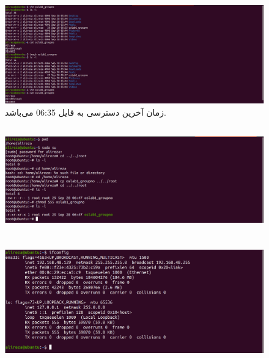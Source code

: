 \documentclass{article}
\begin{document}
\subsection{}
\begin{figure}[ht]
    \centering
    \includegraphics[width=1.0\textwidth]{figures/1.3.png}
    \caption
	{
زمان آخرین دسترسی به فایل 06:35 می‌باشد.
	}
    \label{fig:fig1}
\end{figure}
\FloatBarrier

\subsection{}
\begin{figure}[ht]
    \centering
    \includegraphics[width=1.0\textwidth]{figures/1.4.png}
    \caption{}
    \label{fig:fig1}
\end{figure}
\FloatBarrier

\section{}
\begin{figure}[ht]
    \centering
    \includegraphics[width=1.0\textwidth]{figures/2.png}
    \caption{}
    \label{fig:fig1}
\end{figure}
\FloatBarrier
\end{document}
